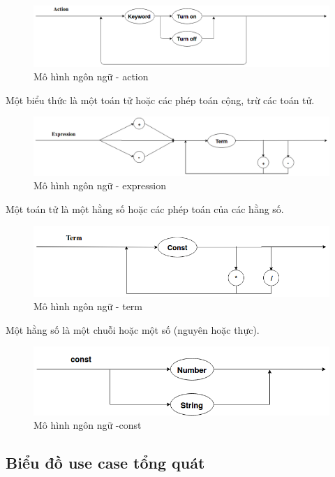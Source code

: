 \begin{figure}[h!]
	\center
	\includegraphics[scale=0.4]{image/language_model-action}
	\caption{Mô hình ngôn ngữ - action}
\end{figure}


Một biểu thức là một toán tử hoặc các phép toán cộng, trừ các toán tử.
\begin{figure}[h!]
	\center
	\includegraphics[scale=0.4]{image/language_model-expression}
	\caption{Mô hình ngôn ngữ - expression}
\end{figure}

Một toán tử là một hằng số hoặc các phép toán của các hằng số.
\begin{figure}[h!]
	\center
	\includegraphics[scale=0.4]{image/language_model-term}
	\caption{Mô hình ngôn ngữ - term}
\end{figure}

Một hằng số là một chuỗi hoặc một số (nguyên hoặc thực).
\begin{figure}[h!]
	\center
	\includegraphics[scale=0.4]{image/language_model-const}	
	\caption{Mô hình ngôn ngữ -const}
\end{figure}
\clearpage


\subsection{Biểu đồ use case tổng quát}

